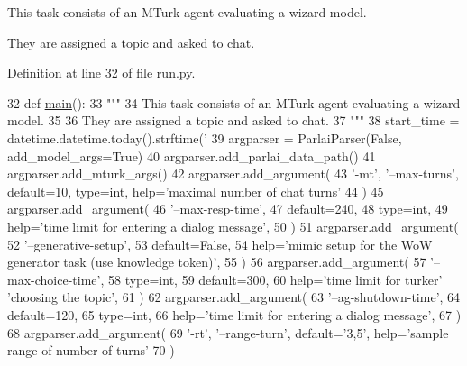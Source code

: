 \begin{DoxyVerb}This task consists of an MTurk agent evaluating a wizard model.

They are assigned a topic and asked to chat.
\end{DoxyVerb}
 

Definition at line 32 of file run.\+py.


\begin{DoxyCode}
32 \textcolor{keyword}{def }\hyperlink{namespaceprojects_1_1wizard__of__wikipedia_1_1mturk__evaluation__task_1_1run_ad3ab2c71f8083c3112815c0b363d316b}{main}():
33     \textcolor{stringliteral}{"""}
34 \textcolor{stringliteral}{    This task consists of an MTurk agent evaluating a wizard model.}
35 \textcolor{stringliteral}{}
36 \textcolor{stringliteral}{    They are assigned a topic and asked to chat.}
37 \textcolor{stringliteral}{    """}
38     start\_time = datetime.datetime.today().strftime(\textcolor{stringliteral}{'%
39     argparser = ParlaiParser(\textcolor{keyword}{False}, add\_model\_args=\textcolor{keyword}{True})
40     argparser.add\_parlai\_data\_path()
41     argparser.add\_mturk\_args()
42     argparser.add\_argument(
43         \textcolor{stringliteral}{'-mt'}, \textcolor{stringliteral}{'--max-turns'}, default=10, type=int, help=\textcolor{stringliteral}{'maximal number of chat turns'}
44     )
45     argparser.add\_argument(
46         \textcolor{stringliteral}{'--max-resp-time'},
47         default=240,
48         type=int,
49         help=\textcolor{stringliteral}{'time limit for entering a dialog message'},
50     )
51     argparser.add\_argument(
52         \textcolor{stringliteral}{'--generative-setup'},
53         default=\textcolor{keyword}{False},
54         help=\textcolor{stringliteral}{'mimic setup for the WoW generator task (use knowledge token)'},
55     )
56     argparser.add\_argument(
57         \textcolor{stringliteral}{'--max-choice-time'},
58         type=int,
59         default=300,
60         help=\textcolor{stringliteral}{'time limit for turker'} \textcolor{stringliteral}{'choosing the topic'},
61     )
62     argparser.add\_argument(
63         \textcolor{stringliteral}{'--ag-shutdown-time'},
64         default=120,
65         type=int,
66         help=\textcolor{stringliteral}{'time limit for entering a dialog message'},
67     )
68     argparser.add\_argument(
69         \textcolor{stringliteral}{'-rt'}, \textcolor{stringliteral}{'--range-turn'}, default=\textcolor{stringliteral}{'3,5'}, help=\textcolor{stringliteral}{'sample range of number of turns'}
70     )
}
\end{DoxyCode}
